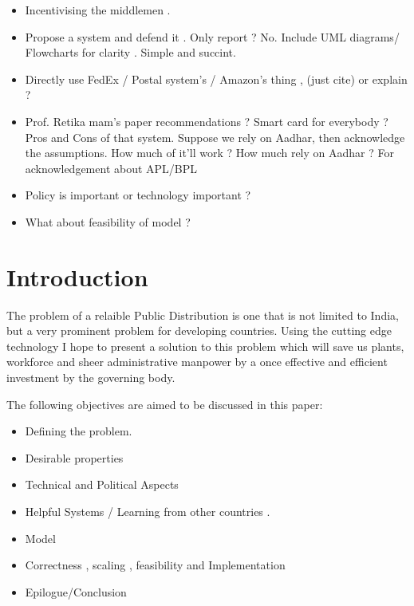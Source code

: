 \documentclass[12pt]{report}
\begin{document}
\begin{itemize}
\item
Incentivising the middlemen .

\item
Propose a system and defend it . Only report ? No. Include UML diagrams/ Flowcharts for clarity . Simple and succint.

\item
Directly use FedEx / Postal system's / Amazon's thing , (just cite) or explain ?

\item
Prof. Retika mam's paper recommendations ? Smart card for everybody ? Pros and Cons of that system.
Suppose we rely on Aadhar, then acknowledge the assumptions. How much of it'll work ?
How much rely on Aadhar ? For acknowledgement about APL/BPL

\item
Policy is important or technology important ?

\item
What about feasibility of model ?  

\end{itemize}


\chapter{Introduction}

The problem of a relaible Public Distribution is one that is not limited to India, but a very prominent problem for developing countries. Using the cutting edge technology I hope to present a solution to this problem which will save us plants, workforce and sheer administrative manpower by a once effective and efficient investment by the governing body.
\\

\vspace{0.5cm}

The following objectives are aimed to be discussed in this paper:
\begin{itemize}
  \item
  Defining the problem.
  \item
  Desirable properties 
  \item
  Technical and Political Aspects
  \item
  Helpful Systems / Learning from other countries .
  \item
  Model  
  \item
  Correctness , scaling , feasibility and Implementation
  \item 
  Epilogue/Conclusion
\end{itemize}
\end{document}
